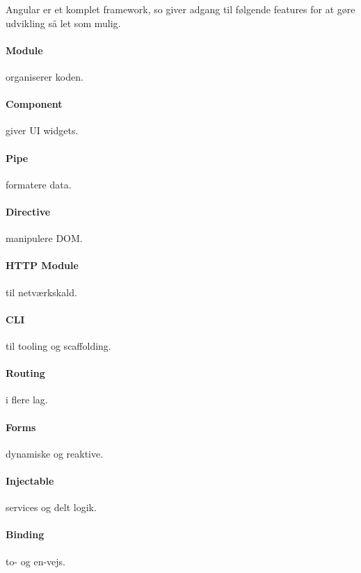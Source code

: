 Angular er et komplet framework, so giver adgang til følgende features for at gøre udvikling så let som mulig.

\begin{multicols}{2}
\paragraph{Module} organiserer koden.
\paragraph{Component} giver UI widgets.
\paragraph{Pipe} formatere data.
\paragraph{Directive} manipulere DOM.
\paragraph{HTTP Module} til netværkskald.
\paragraph{CLI} til tooling og scaffolding.
\paragraph{Routing} i flere lag.
\paragraph{Forms} dynamiske og reaktive.
\paragraph{Injectable} services og delt logik.
\paragraph{Binding} to- og en-vejs. 
\end{multicols}
